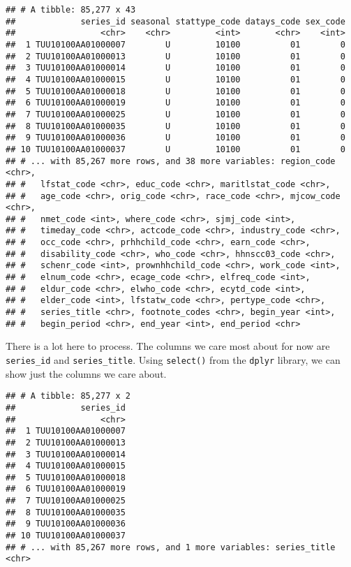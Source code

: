 \documentclass[]{book}
\newenvironment{Shaded}{\begin{snugshade}}{\end{snugshade}}
\newcommand{\KeywordTok}[1]{\textcolor[rgb]{0.13,0.29,0.53}{\textbf{{#1}}}}
\newcommand{\StringTok}[1]{\textcolor[rgb]{0.31,0.60,0.02}{{#1}}}
\newcommand{\NormalTok}[1]{{#1}}
\theoremstyle{definition}
\theoremstyle{definition}
\theoremstyle{remark}
\begin{document}
\begin{verbatim}
## # A tibble: 85,277 x 43
##             series_id seasonal stattype_code datays_code sex_code
##                 <chr>    <chr>         <int>       <chr>    <int>
##  1 TUU10100AA01000007        U         10100          01        0
##  2 TUU10100AA01000013        U         10100          01        0
##  3 TUU10100AA01000014        U         10100          01        0
##  4 TUU10100AA01000015        U         10100          01        0
##  5 TUU10100AA01000018        U         10100          01        0
##  6 TUU10100AA01000019        U         10100          01        0
##  7 TUU10100AA01000025        U         10100          01        0
##  8 TUU10100AA01000035        U         10100          01        0
##  9 TUU10100AA01000036        U         10100          01        0
## 10 TUU10100AA01000037        U         10100          01        0
## # ... with 85,267 more rows, and 38 more variables: region_code <chr>,
## #   lfstat_code <chr>, educ_code <chr>, maritlstat_code <chr>,
## #   age_code <chr>, orig_code <chr>, race_code <chr>, mjcow_code <chr>,
## #   nmet_code <int>, where_code <chr>, sjmj_code <int>,
## #   timeday_code <chr>, actcode_code <chr>, industry_code <chr>,
## #   occ_code <chr>, prhhchild_code <chr>, earn_code <chr>,
## #   disability_code <chr>, who_code <chr>, hhnscc03_code <chr>,
## #   schenr_code <int>, prownhhchild_code <chr>, work_code <int>,
## #   elnum_code <chr>, ecage_code <chr>, elfreq_code <int>,
## #   eldur_code <chr>, elwho_code <chr>, ecytd_code <int>,
## #   elder_code <int>, lfstatw_code <chr>, pertype_code <chr>,
## #   series_title <chr>, footnote_codes <chr>, begin_year <int>,
## #   begin_period <chr>, end_year <int>, end_period <chr>
\end{verbatim}

There is a lot here to process. The columns we care most about for now
are \texttt{series\_id} and \texttt{series\_title}. Using
\texttt{select()} from the \texttt{dplyr} library, we can show just the
columns we care about.

\begin{Shaded}
\end{Shaded}

\begin{verbatim}
## # A tibble: 85,277 x 2
##             series_id
##                 <chr>
##  1 TUU10100AA01000007
##  2 TUU10100AA01000013
##  3 TUU10100AA01000014
##  4 TUU10100AA01000015
##  5 TUU10100AA01000018
##  6 TUU10100AA01000019
##  7 TUU10100AA01000025
##  8 TUU10100AA01000035
##  9 TUU10100AA01000036
## 10 TUU10100AA01000037
## # ... with 85,267 more rows, and 1 more variables: series_title <chr>
\end{verbatim}
\end{document}
